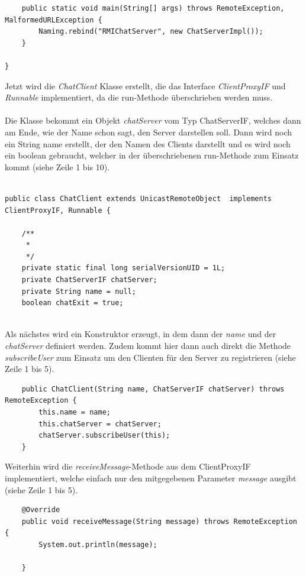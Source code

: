 \begin{lstlisting}
	public static void main(String[] args) throws RemoteException, MalformedURLException {
		Naming.rebind("RMIChatServer", new ChatServerImpl());
	}

}
\end{lstlisting}

Jetzt wird die \textit{ChatClient} Klasse erstellt, die das Interface \textit{ClientProxyIF} und \textit{Runnable} implementiert, da die run-Methode überschrieben werden muss. \\
\\
Die Klasse bekommt ein Objekt \textit{chatServer} vom Typ ChatServerIF, welches dann am Ende, wie der Name schon sagt, den Server darstellen soll. Dann wird noch ein String name erstellt, der den Namen des Clients darstellt und es wird noch ein boolean gebraucht, welcher in der überschriebenen run-Methode zum Einsatz kommt (siehe Zeile 1 bis 10).

\begin{lstlisting}

public class ChatClient extends UnicastRemoteObject	 implements ClientProxyIF, Runnable {

	/**
	 * 
	 */
	private static final long serialVersionUID = 1L;
	private ChatServerIF chatServer;
	private String name = null;
	boolean chatExit = true;
	
\end{lstlisting}


Als nächstes wird ein Konstruktor erzeugt, in dem dann der \textit{name} und der \textit{chatServer} definiert werden. Zudem kommt hier dann auch direkt die Methode \textit{subscribeUser} zum Einsatz um den Clienten für den Server zu registrieren (siehe Zeile 1 bis 5).

\begin{lstlisting}
	public ChatClient(String name, ChatServerIF chatServer) throws RemoteException {
		this.name = name;
		this.chatServer = chatServer;
		chatServer.subscribeUser(this);
	}
\end{lstlisting}


Weiterhin wird die \textit{receiveMessage}-Methode aus dem ClientProxyIF implementiert, welche einfach nur den mitgegebenen Parameter \textit{message} ausgibt (siehe Zeile 1 bis 5).

\begin{lstlisting}
	@Override
	public void receiveMessage(String message) throws RemoteException {
		System.out.println(message);
		
	}
\end{lstlisting}	

